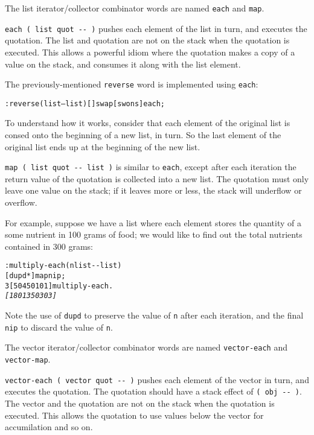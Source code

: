 \documentclass[english]{article}
\begin{document}
{The list iterator/collector combinator words are named \texttt{each} and \texttt{map}.

\texttt{each ( list quot -{}- )} pushes each element of the list in
turn, and executes the quotation. The list and quotation are not on
the stack when the quotation is executed. This allows a powerful idiom
where the quotation makes a copy of a value on the stack, and consumes
it along with the list element.

The previously-mentioned \texttt{reverse} word is implemented using
\texttt{each}:

\begin{alltt}
: reverse ( list -- list ) {[} {]} swap {[} swons {]} each ;
\end{alltt}

To understand how it works, consider that each element of the original
list is consed onto the beginning of a new list, in turn. So the last
element of the original list ends up at the beginning of the new list.

\texttt{map ( list quot -{}- list )} is similar to \texttt{each},
except after each iteration the return value of the quotation is collected into a new
list. The quotation must only leave one value on the stack; if it leaves more or less, the stack will underflow or overflow.

For example, suppose we have a list where each element stores the
quantity of a some nutrient in 100 grams of food; we would like to
find out the total nutrients contained in 300 grams:

\begin{alltt}
: multiply-each ( n list -{}- list )
    {[} dupd {*} {]} map nip ;
3 {[} 50 450 101 {]} multiply-each .
\emph{{[} 180 1350 303 {]}}
\end{alltt}

Note the use of \texttt{dupd} to preserve the value of \texttt{n} after each iteration, and the final \texttt{nip} to discard the value of \texttt{n}.

The vector iterator/collector combinator words are named \texttt{vector-each} and \texttt{vector-map}.

\texttt{vector-each ( vector quot -{}- )} pushes each element of the vector in turn, and executes the quotation. The quotation should have a stack effect of \texttt{( obj -{}- )}. The vector and the quotation are not on the stack when the quotation is executed. This allows the quotation to use values below the vector for accumilation and so on.

}
\end{document}
